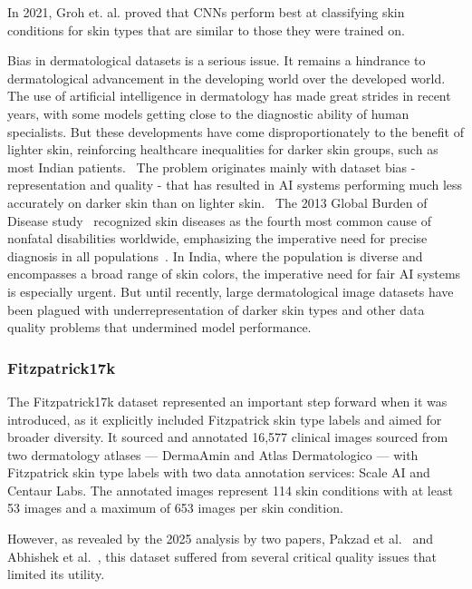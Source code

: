 In 2021, Groh et. al. proved that CNNs perform best at classifying skin conditions for skin types that are similar to those they were trained on. ~\cite{groh}\par

Bias in dermatological datasets is a serious issue. It remains a hindrance to dermatological advancement in the developing world over the developed world. The use of artificial intelligence in dermatology has made great strides in recent years, with some models getting close to the diagnostic ability of human specialists. But these developments have come disproportionately to the benefit of lighter skin, reinforcing healthcare inequalities for darker skin groups, such as most Indian patients.~\cite{alip} The problem originates mainly with dataset bias - representation and quality - that has resulted in AI systems performing much less accurately on darker skin than on lighter skin.~\cite{agg} The 2013 Global Burden of Disease study~\cite{mok} recognized skin diseases as the fourth most common cause of nonfatal disabilities worldwide, emphasizing the imperative need for precise diagnosis in all populations~\cite{isic2018}. In India, where the population is diverse and encompasses a broad range of skin colors, the imperative need for fair AI systems is especially urgent. But until recently, large dermatological image datasets have been plagued with underrepresentation of darker skin types and other data quality problems that undermined model performance.

\subsubsection{Fitzpatrick17k}

The Fitzpatrick17k dataset represented an important step forward when it was introduced, as it explicitly included Fitzpatrick skin type labels and aimed for broader diversity. It sourced and annotated 16,577 clinical images sourced from two dermatology atlases — DermaAmin and Atlas Dermatologico — with Fitzpatrick skin type labels with two data annotation services: Scale AI and Centaur Labs. The annotated images represent 114 skin conditions with at least 53 images and a maximum of 653 images per skin condition. \cite{fitz}

However, as revealed by the 2025 analysis by two papers, Pakzad et al.~\cite{pakzad} and Abhishek et al.~\cite{abhi}, this dataset suffered from several critical quality issues that limited its utility.

